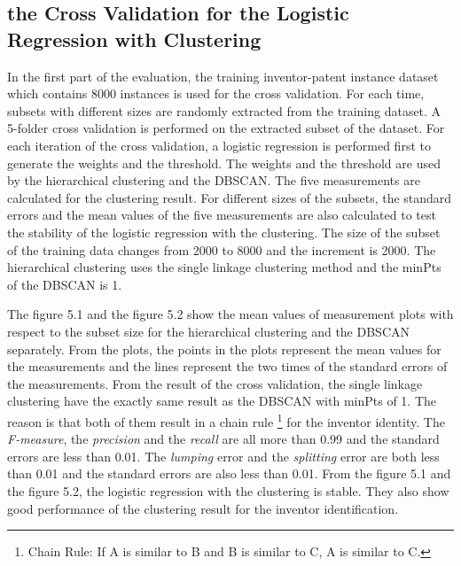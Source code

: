 \subsection{the Cross Validation for the Logistic Regression with Clustering}
In the first part of the evaluation, the training inventor-patent instance dataset which contains 8000 instances is used for the cross validation. For each time, subsets with different sizes are randomly extracted from the training dataset. A 5-folder cross validation is performed on the extracted subset of the dataset. For each iteration of the cross validation, a logistic regression is performed first to generate the weights and the threshold. The weights and the threshold are used by the hierarchical clustering and the DBSCAN. The five measurements are calculated for the clustering result. For different sizes of the subsets, the standard errors and the mean values of the five measurements are also calculated to test the stability of the logistic regression with the clustering. The size of the subset of the training data changes from 2000 to 8000 and the increment is 2000. The hierarchical clustering uses the single linkage clustering method and the minPts of the DBSCAN is 1.
\newline

The figure 5.1 and the figure 5.2 show the mean values of measurement plots with respect to the subset size for the hierarchical clustering and the DBSCAN separately. From the plots, the points in the plots represent the mean values for the measurements and the lines represent the two times of the standard errors of the measurements. From the result of the cross validation, the single linkage clustering have the exactly same result as the DBSCAN with minPts of 1. The reason is that both of them result in a chain rule \footnote{Chain Rule: If A is similar to B and B is similar to C, A is similar to C.} for the inventor identity. The \emph{F-measure}, the \emph{precision} and the \emph{recall} are all more than 0.99 and the standard errors are less than 0.01. The \emph{lumping} error and the \emph{splitting} error are both less than 0.01 and the standard errors are also less than 0.01. From the figure 5.1 and the figure 5.2, the logistic regression with the clustering is stable. They also show good performance of the clustering result for the inventor identification.  \newline

